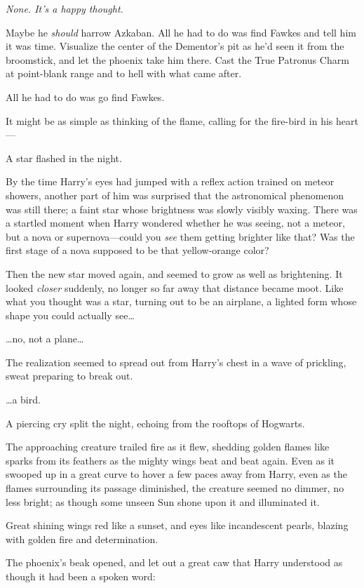 \emph{None. It's a happy thought.}

Maybe he \emph{should} harrow Azkaban. All he had to do was find Fawkes and 
tell him it was time. Visualize the center of the Dementor's pit as he'd seen 
it from the broomstick, and let the phoenix take him there. Cast the True 
Patronus Charm at point-blank range and to hell with what came after.

All he had to do was go find Fawkes.

It might be as simple as thinking of the flame, calling for the fire-bird in 
his heart---

A star flashed in the night.

By the time Harry's eyes had jumped with a reflex action trained on meteor 
showers, another part of him was surprised that the astronomical phenomenon was 
still there; a faint star whose brightness was slowly visibly waxing. There was 
a startled moment when Harry wondered whether he was seeing, not a meteor, but 
a nova or supernova---could you \emph{see} them getting brighter like that? Was 
the first stage of a nova supposed to be that yellow-orange color?

Then the new star moved again, and seemed to grow as well as brightening. It 
looked \emph{closer} suddenly, no longer so far away that distance became moot. 
Like what you thought was a star, turning out to be an airplane, a lighted form 
whose shape you could actually see{\ldots}

{\ldots}no, not a plane{\ldots}

The realization seemed to spread out from Harry's chest in a wave of prickling, 
sweat preparing to break out.

{\ldots}a bird.

A piercing cry split the night, echoing from the rooftops of Hogwarts.

The approaching creature trailed fire as it flew, shedding golden flames like 
sparks from its feathers as the mighty wings beat and beat again. Even as it 
swooped up in a great curve to hover a few paces away from Harry, even as the 
flames surrounding its passage diminished, the creature seemed no dimmer, no 
less bright; as though some unseen Sun shone upon it and illuminated it.

Great shining wings red like a sunset, and eyes like incandescent pearls, 
blazing with golden fire and determination.

The phoenix's beak opened, and let out a great caw that Harry understood as 
though it had been a spoken word:

